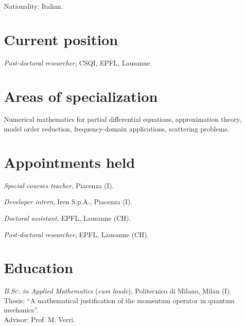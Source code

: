 \documentclass[11pt]{article} %
\begin{document}
Nationality: Italian. %


\medskip %

\section*{Current position}

\emph{Post-doctoral researcher}, CSQI, EPFL, Lausanne. %


\section*{Areas of specialization}

Numerical mathematics for partial differential equations, approximation theory, model order reduction, frequency-domain applications, scattering problems.


\section*{Appointments held}

\hspace{\parindent}\emph{Special courses teacher}, Piacenza (I).

\emph{Developer intern}, Iren S.p.A., Piacenza (I).

\emph{Doctoral assistant}, EPFL, Lausanne (CH).

\emph{Post-doctoral researcher}, EPFL, Lausanne (CH).


\section*{Education}

\hspace{\parindent}\emph{\textsc{B.Sc.} in Applied Mathematics} (\emph{cum laude}), Politecnico di Milano, Milan (I).\\
Thesis: ``A mathematical justification of the momentum operator in quantum mechanics''.\\
\phantom{m}\hfill Advisor: Prof. M. Verri.
\end{document}

